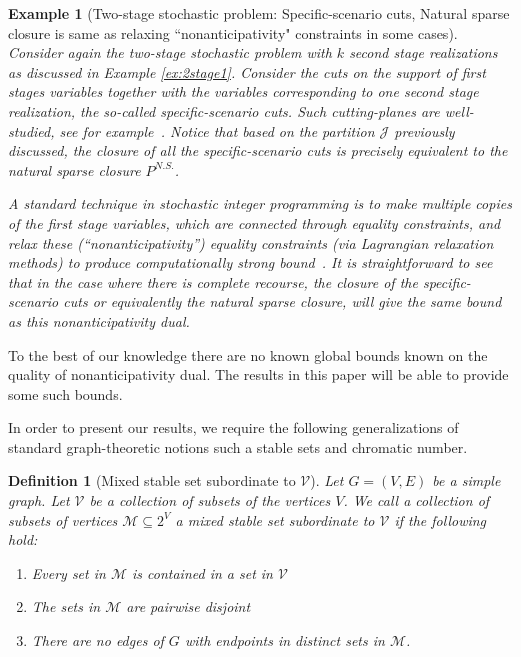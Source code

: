 \documentclass[smallextended]{svjour3}
\newtheorem{definition}[proposition]{Definition}
\newtheorem{example}[proposition]{Example}
\begin{document}
\begin{example}[Two-stage stochastic problem: Specific-scenario cuts, Natural sparse closure is same as relaxing ``nonanticipativity" constraints in some cases]\label{ex:2stage2}
Consider again the two-stage stochastic problem with $k$ second stage realizations as discussed in Example \ref{ex:2stage1}. Consider the cuts on the support of first stages variables together with the variables corresponding to one second stage realization, the so-called \emph{specific-scenario cuts}. Such cutting-planes are well-studied, see for example~\cite{GuanAN09,ZhangK14}. Notice that based on the partition $\mathcal{J}$ previously discussed, the closure of all the specific-scenario cuts is precisely equivalent to the natural sparse closure $P^{N.S.}$.

A standard technique in stochastic integer programming is to make multiple copies of the first stage variables, which are connected through equality constraints, and relax these (``nonanticipativity'') equality constraints (via Lagrangian relaxation methods) to produce computationally strong bound~\cite{CaroeS99}.
It is straightforward to see that in the case where there is complete recourse, the closure of the specific-scenario cuts or equivalently the natural sparse closure, 
will give the same bound as this nonanticipativity dual. 
\end{example}

To the best of our knowledge there are no known global bounds known on the quality of nonanticipativity dual. The results in this paper will be able to provide some such bounds. 

In order to present our results, we require the following generalizations of standard graph-theoretic notions such a stable sets and chromatic number.
\begin{definition}[Mixed stable set subordinate to $\mathcal{V}$]\label{defn:graph theoretic}
Let $G = (V, E)$ be a simple graph. Let ${\mathcal{V}}$ be a collection of subsets of the vertices $V$. We call a collection of subsets of vertices $\mathcal{M} \subseteq 2^{V}$ a \emph{mixed stable set subordinate to} $\mathcal{V}$ if the following hold:
\begin{enumerate}
\item Every set in $\mathcal{M}$ is contained in a set in ${\mathcal{V}}$
\item The sets in $\mathcal{M}$ are pairwise disjoint
\item There are no edges of $G$ with endpoints in distinct sets in $\mathcal{M}$.
\end{enumerate}
\end{definition}
\end{document}
